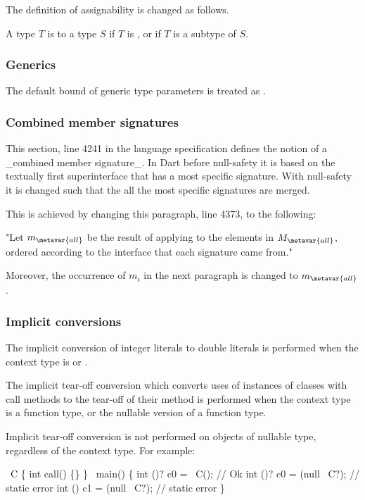 \documentclass[makeidx]{article}
\begin{document}
{The definition of assignability is changed as follows.

A type $T$ is  to a type $S$ if $T$ is \DYNAMIC, or if $T$ is a
subtype of $S$.

\subsubsection{Generics}

The default bound of generic type parameters is treated as .

\subsubsection{Combined member signatures}

This section, line 4241
in the language specification defines the notion of a _combined member
signature_. In Dart before null-safety it is based on the textually first
superinterface that has a most specific signature. With null-safety it
is changed such that the all the most specific signatures are merged.

This is achieved by changing this paragraph, line 4373,
to the following:

"Let $m_{\metavar{all}}$ be the result of applying \NnbdTopMergeName{} to
the elements in $M_{\metavar{all}}$, ordered according to the interface
 that each signature came from."

Moreover, the occurrence of $m_i$ in the next paragraph is
changed to $m_{\metavar{all}}$.

\subsubsection{Implicit conversions}

The implicit conversion of integer literals to double literals is performed when
the context type is  or .

The implicit tear-off conversion which converts uses of instances of classes
with call methods to the tear-off of their \CALL{} method is performed when the
context type is a function type, or the nullable version of a function type.

Implicit tear-off conversion is not performed on objects of nullable type,
regardless of the context type.  For example:

\begin{dartCode}
\CLASS\ C \{
  int call() \{\}
\}
\VOID\ main() \{
  int \FUNCTION()? c0 = \NEW\ C(); // Ok
  int \FUNCTION()? c0 = (null \AS\ C?); // static error
  int \FUNCTION()  c1 = (null \AS\ C?); // static error
\}
\end{dartCode}

}
\end{document}
